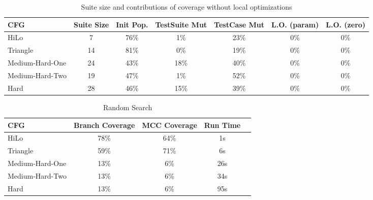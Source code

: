 \documentclass[runningheads]{llncs}
\begin{document}
\begin{table}[h!]
	\begin{center}
		\begin{tabular}{| l | c || c | c | c | c | c |}
			\hline
			CFG             & Suite Size & Init Pop. & TestSuite Mut & TestCase Mut & L.O. (param) & L.O. (zero) \\ \hline
			HiLo            & 7          & 76\%      & 1\%           & 23\%         & 0\%          & 0\%         \\ \hline
			Triangle        & 14         & 81\%      & 0\%           & 19\%         & 0\%          & 0\%         \\ \hline
			Medium-Hard-One & 24         & 43\%      & 18\%          & 40\%         & 0\%          & 0\%         \\ \hline
			Medium-Hard-Two & 19         & 47\%      & 1\%           & 52\%         & 0\%          & 0\%         \\ \hline
			Hard            & 28         & 46\%      & 15\%          & 39\%         & 0\%          & 0\%         \\ \hline
		\end{tabular}
	\end{center}
	\caption{Suite size and contributions of coverage without local optimizations}
	\label{tab:ContribNoLO}
\end{table}




\begin{table}[h!]
\begin{center}
	\begin{tabular}{| l | c | c | c | c |}
		\hline
		CFG             & Branch Coverage & MCC Coverage & Run Time   \\ \hline
		HiLo            & 78\%            & 64\%         & 1s         \\ \hline
		Triangle        & 59\%            & 71\%         & 6s         \\ \hline
		Medium-Hard-One & 13\%            & 6\%          & 26s        \\ \hline
		Medium-Hard-Two & 13\%            & 6\%          & 34s        \\ \hline
		Hard            & 13\%            & 6\%          & 95s        \\ \hline
	\end{tabular}
\end{center}

\caption{Random Search \label{tab:randSrch}}
\end{table}
\end{document}

